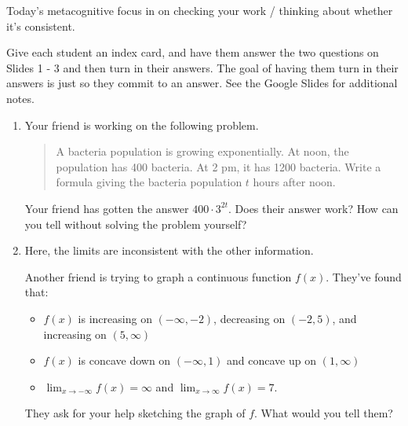 \documentclass{article}
\begin{document}

\begin{workshop}
  Today's metacognitive focus in on checking your work / thinking about whether it's consistent.

  Give each student an index card, and have them answer the two questions on Slides 1 - 3 and then turn in their answers. The goal of having them turn in their answers is just so they commit to an answer. See the Google Slides for additional notes. 
\end{workshop}

\begin{enumerate}
\item 
  \begin{problem}[\stretch{0.5}]
    Your friend is working on the following problem.

    \begin{quote}
      A bacteria population is growing exponentially. At noon, the population has 400 bacteria. At 2 pm, it has 1200 bacteria. Write a formula giving the bacteria population $t$ hours after noon.
    \end{quote}

    Your friend has gotten the answer $400 \cdot 3^{2t}$. Does their answer work? How can you tell without solving the problem yourself?
  \end{problem} 

\item 

  \begin{workshop}
    Here, the limits are inconsistent with the other information. 
  \end{workshop}

  \begin{problem}[\vfill\newpage]
    Another friend is trying to graph a continuous function $f(x)$. They've found that:
    \begin{itemize}
    \item $f(x)$ is increasing on $(-\infty, -2)$, decreasing on $(-2, 5)$, and increasing on $(5, \infty)$
    \item $f(x)$ is concave down on $(-\infty, 1)$ and concave up on $(1, \infty)$
    \item $\displaystyle \lim_{x \to -\infty} f(x) = \infty$ and $\displaystyle \lim_{x \to \infty} f(x) = 7$.
    \end{itemize}
    They ask for your help sketching the graph of $f$. What would you tell them?
  \end{problem}


\end{enumerate}
\end{document}
